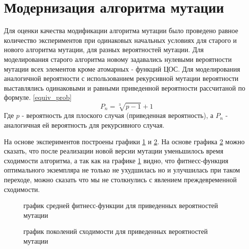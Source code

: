 \documentclass[utf8,usehyperref,12pt]{G7-32}
\begin{document}
\section{Модернизация алгоритма мутации}
Для оценки качества модификации алгоритма мутации было проведено равное количество экспериментов при одинаковых начальных условиях для старого и нового алгоритма мутации, для разных вероятностей мутации. Для моделирования старого алгоритма новому задавались нулевыми вероятности мутации всех элементов кроме атомарных - функций ЦОС. Для моделирования аналогичной вероятности с использованием рекурсивной мутации вероятности выставлялись одинаковыми и равными приведенной вероятности рассчитаной по формуле. \ref{equiv_prob}
\begin{equation}
P_{n}=\sqrt[3]{p-1}+1
\label{equiv_prob}
\end{equation}
Где $ p $ - вероятность для плоского случая (приведенная вероятность), а $ P_{n} $ - аналогичная ей вероятность для рекурсивного случая.

На основе экспериментов построены графики \ref{mutate_diff_fit} и \ref{mutate_diff_gen}. На основе графика  \ref{mutate_diff_gen} можно сказать, что после реализации новой версии мутации уменьшилось время сходимости алгоритма, а так как на графике \ref{mutate_diff_fit} видно, что фитнесс-функция оптимального экземпляра не только не ухудшилась но и улучшилась при таком переходе, можно сказать что мы не столкнулись с явлением преждевременной сходимости.
\begin{figure}[H]
 \caption{график средней фитнесс-функции для приведенных вероятностей мутации}\label{mutate_diff_fit}
\end{figure}
\begin{figure}[H]
 \caption{график поколений сходимости для приведенных вероятностей мутации}\label{mutate_diff_gen}
\end{figure}
\end{document}

